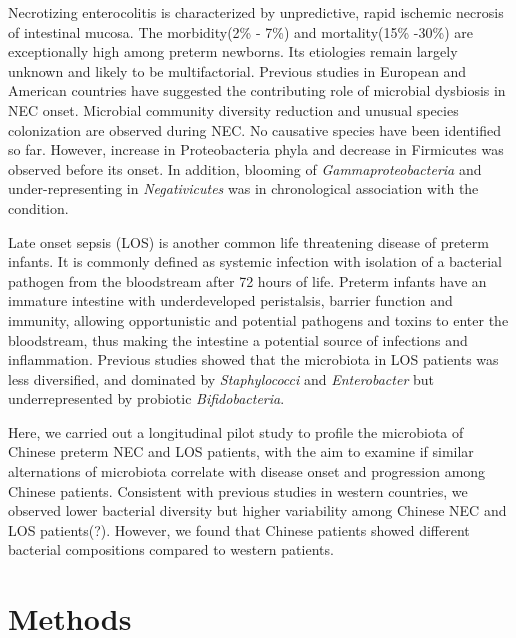 \documentclass[fleqn,10pt]{wlpeerj} %
\begin{document}
\noindent
Necrotizing enterocolitis is characterized by unpredictive, rapid ischemic necrosis of intestinal mucosa. The morbidity(2\% - 7\%) and mortality(15\% -30\%)\citep{stoll2015trends} are exceptionally high among preterm newborns\citep{neu2011necrotizing}. Its etiologies remain largely unknown and likely to be multifactorial. Previous studies in European and American countries have suggested the contributing role of microbial dysbiosis in NEC onset. Microbial community diversity reduction and unusual species colonization are observed during NEC\citep{jacquot2011dynamics,Warner2016a}. No causative species have been identified so far. However, increase in Proteobacteria phyla and decrease in Firmicutes was observed before its onset\citep{mai2011fecal, zhou2015longitudinal}. In addition, blooming of \textit{Gammaproteobacteria} and under-representing in \textit{Negativicutes} was in chronological association with the condition\citep{Warner2016a}.

\noindent
Late onset sepsis (LOS) is another common life threatening disease of preterm infants. It is commonly defined as systemic infection with isolation of a bacterial pathogen from the bloodstream after 72 hours of life\citep{rao2016one, pickering2012red}. Preterm infants have an immature intestine with underdeveloped peristalsis, barrier function and immunity, allowing opportunistic and potential pathogens and toxins to enter the bloodstream\citep{korpela2018intestinal}, thus making the intestine a potential source of infections and inflammation. Previous studies showed that the microbiota in LOS patients was less diversified, and dominated by \textit{Staphylococci} and \textit{Enterobacter} but underrepresented by probiotic \textit{Bifidobacteria}\citep{madan2012gut,tarr2016gut,Stewart2017Longitudinal,korpela2018intestinal,ficara2018changes}.

\noindent
Here, we carried out a longitudinal pilot study to profile the microbiota of Chinese preterm NEC and LOS patients, with the aim to examine if similar alternations of microbiota correlate with disease onset and progression among Chinese patients. Consistent with previous studies in western countries, we observed lower bacterial diversity but higher variability among Chinese NEC and LOS patients(?).  However, we found that Chinese patients showed different bacterial compositions compared to western patients.


\section*{Methods}
\end{document}

